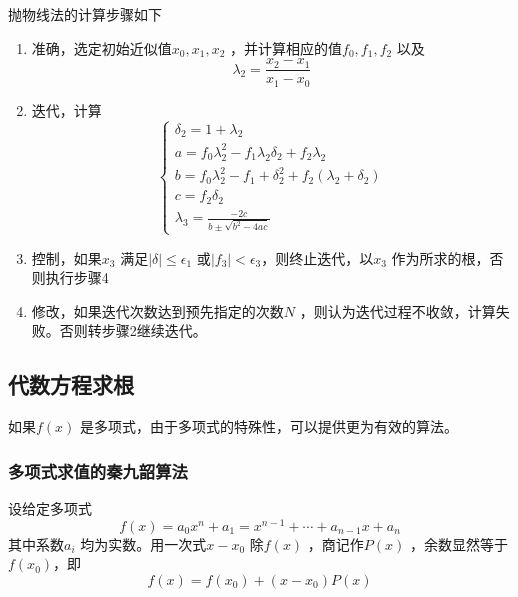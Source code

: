 \documentclass[a4paper]{article}
\begin{document}
抛物线法的计算步骤如下
\begin{enumerate}
	\item 准确，选定初始近似值$x_0, x_1, x_2$ ，并计算相应的值$f_0, f_1, f_2$ 以及
		\[
		\lambda_2 = \frac{x_2 - x_1}{x_1 - x_0}
		\] 
	\item 迭代，计算
		\[
			\begin{cases}
				\delta_2 = 1 + \lambda_2 \\
				a = f_0 \lambda_2^2 - f_1 \lambda_2 \delta_2 + f_2 \lambda_2 \\
				b = f_0 \lambda_2^2 - f_1 + \delta_2^2 + f_2 (\lambda_2 + \delta_2) \\
				c = f_2 \delta_2 \\
				\lambda_3 = \frac{-2c}{b \pm \sqrt{b^2 - 4ac} }
			\end{cases} 
		\] 
	\item 控制，如果$x_3$ 满足$|\delta| \le \epsilon_1$ 或$|f_3| < \epsilon_3$，则终止迭代，以$x_3$ 作为所求的根，否则执行步骤4
	\item 修改，如果迭代次数达到预先指定的次数$N$ ，则认为迭代过程不收敛，计算失败。否则转步骤2继续迭代。
\end{enumerate}

\subsection{代数方程求根}
如果$f(x)$ 是多项式，由于多项式的特殊性，可以提供更为有效的算法。

\subsubsection{多项式求值的秦九韶算法}
设给定多项式
\[
	f(x) = a_0 x^{n} + a_1 = x^{n-1} + \cdots + a_{n-1} x + a_n
\] 
其中系数$a_i$ 均为实数。用一次式$x - x_0$ 除$f(x)$ ，商记作$P(x)$ ，余数显然等于$f(x_0)$，即
\[
f(x) = f(x_0) + (x-x_0) P(x) \tag{5.5.1} \label{eq:5.5.1} 
\] 
\end{document}

